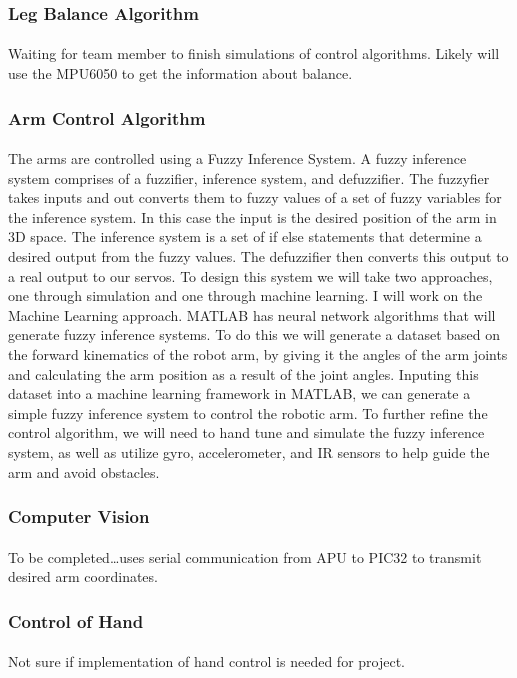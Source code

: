 \documentclass[letterpaper,12pt]{article}
\begin{document}
\subsubsection{Leg Balance Algorithm}
\paragraph{} Waiting for team member to finish simulations of control
algorithms. Likely will use the MPU6050 to get the information about balance.

\subsubsection{Arm Control Algorithm}
\paragraph{} The arms are controlled using a Fuzzy Inference System. A fuzzy
inference system comprises of a fuzzifier, inference system, and defuzzifier.
The fuzzyfier takes inputs and out converts them to fuzzy values of a set of
fuzzy variables for the inference system. In this case the input is the desired
position of the arm in 3D space. The inference system is a set of if else
statements that determine a desired output from the fuzzy values. The
defuzzifier then converts this output to a real output to our
servos\cite{fuzzy2011}. To design this system we will take two approaches, one
through simulation and one through machine learning. I will work on the Machine
Learning approach. MATLAB has neural network algorithms that will generate fuzzy
inference systems. To do this we will generate a dataset based on the forward
kinematics of the robot arm, by giving it the angles of the arm joints and
calculating the arm position as a result of the joint angles. Inputing this
dataset into a machine learning framework in MATLAB, we can generate a simple
fuzzy inference system to control the robotic arm\cite{fuzzymatlab}. To further
refine the control algorithm, we will need to hand tune and simulate the fuzzy
inference system, as well as utilize gyro, accelerometer, and IR sensors to help
guide the arm and avoid obstacles.

\subsubsection{Computer Vision}
\paragraph{} To be completed\dots uses serial communication from APU to PIC32 to
transmit desired arm coordinates.

\subsubsection{Control of Hand}
\paragraph{} Not sure if implementation of hand control is needed for project.

\printbibliography
\end{document}
